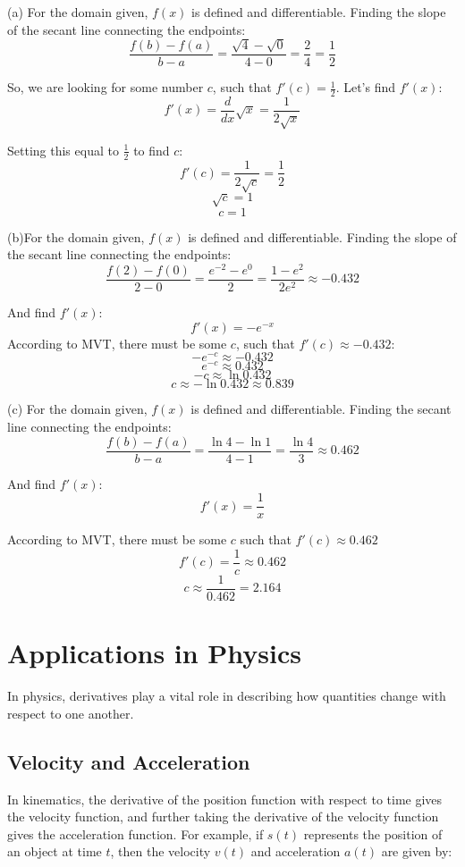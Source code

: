 \begin{Answer}
[ref=MVT2]
(a) For the domain given, $f(x)$ is defined and differentiable. Finding the 
slope of the secant line connecting the endpoints:
$$\frac{f(b)-f(a)}{b-a}=\frac{\sqrt{4}-\sqrt{0}}{4-0}=\frac{2}{4}=\frac{1}{2}$$

So, we are looking for some number $c$, such that $f'(c) = \frac{1}{2}$. Let's 
find $f'(x)$:
$$f'(x) = \frac{d}{dx}\sqrt{x}=\frac{1}{2\sqrt{x}}$$

Setting this equal to $\frac{1}{2}$ to find $c$:
$$f'(c) = \frac{1}{2\sqrt{c}}=\frac{1}{2}$$
$$\sqrt{c}=1$$
$$c=1$$

(b)For the domain given, $f(x)$ is defined and differentiable. Finding the 
slope of the secant line connecting the endpoints:
$$\frac{f(2) - f(0)}{2 - 0}=\frac{e^{-2} - e^{0}}{2}=\frac{1 - e^{2}}{2e^{2}} 
\approx -0.432$$

And find $f'(x)$:
$$f'(x) = -e^{-x}$$
According to MVT, there must be some $c$, such that $f'(c) \approx-0.432$:
$$-e^{-c} \approx -0.432$$
$$e^{-c}\approx 0.432$$
$$-c \approx \ln{0.432}$$
$$c \approx -\ln{0.432} \approx 0.839$$

(c) For the domain given, $f(x)$ is defined and differentiable. Finding the 
secant line connecting the endpoints:
$$\frac{f(b) - f(a)}{b - a}=\frac{\ln{4} - \ln{1}}{4 - 1} = \frac{\ln{4}}{3} 
\approx 0.462$$

And find $f'(x)$:
$$f'(x) = \frac{1}{x}$$

According to MVT, there must be some $c$ such that $f'(c) \approx 0.462$
$$f'(c) = \frac{1}{c} \approx 0.462$$
$$c \approx \frac{1}{0.462} = 2.164$$
\end{Answer}



\section{Applications in Physics}

In physics, derivatives play a vital role in describing how quantities change 
with respect to one another.

\subsection{Velocity and Acceleration}

In kinematics, the derivative of the position function with respect to time 
gives the velocity function, and further taking the derivative of the velocity 
function gives the acceleration function. For example, if $s(t)$ represents 
the position of an object at time $t$, then the velocity $v(t)$ and 
acceleration $a(t)$ are given by:

